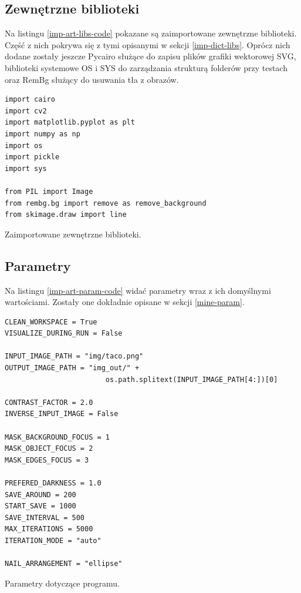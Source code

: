 \documentclass[a4paper, 12pt, polish, twoside]{extreport}
\begin{document}
        \subsection{Zewnętrzne biblioteki} \label{imp-art-libs}
        Na listingu \ref{imp-art-libs-code} pokazane są zaimportowane zewnętrzne biblioteki. Część z nich pokrywa się z tymi opisanymi w sekcji \ref{imp-dict-libs}.  Oprócz nich dodane zostały jeszcze Pycairo służące do zapisu plików grafiki wektorowej SVG, biblioteki systemowe OS i SYS do zarządzania strukturą folderów przy testach oraz RemBg służący do usuwania tła z obrazów.
        \begin{code}[H]
        \begin{verbatim}
import cairo
import cv2
import matplotlib.pyplot as plt
import numpy as np
import os
import pickle
import sys

from PIL import Image
from rembg.bg import remove as remove_background
from skimage.draw import line
        \end{verbatim}
        \caption{Zaimportowane zewnętrzne biblioteki.}
        \label{imp-art-libs-code}
        \end{code}
        
        \newpage
        \subsection{Parametry} \label{imp-art-param}
        Na listingu \ref{imp-art-param-code} widać parametry wraz z ich domyślnymi wartościami. Zostały one dokładnie opisane w sekcji \ref{mine-param}.
        \begin{code}[H]
        \begin{verbatim}
CLEAN_WORKSPACE = True
VISUALIZE_DURING_RUN = False

INPUT_IMAGE_PATH = "img/taco.png"
OUTPUT_IMAGE_PATH = "img_out/" + 
                        os.path.splitext(INPUT_IMAGE_PATH[4:])[0]

CONTRAST_FACTOR = 2.0
INVERSE_INPUT_IMAGE = False

MASK_BACKGROUND_FOCUS = 1
MASK_OBJECT_FOCUS = 2
MASK_EDGES_FOCUS = 3

PREFERED_DARKNESS = 1.0
SAVE_AROUND = 200 
START_SAVE = 1000
SAVE_INTERVAL = 500 
MAX_ITERATIONS = 5000 
ITERATION_MODE = "auto" 

NAIL_ARRANGEMENT = "ellipse"
        \end{verbatim}
        \caption{Parametry dotyczące programu.}
        \label{imp-art-param-code}
        \end{code}
        
\end{document}

